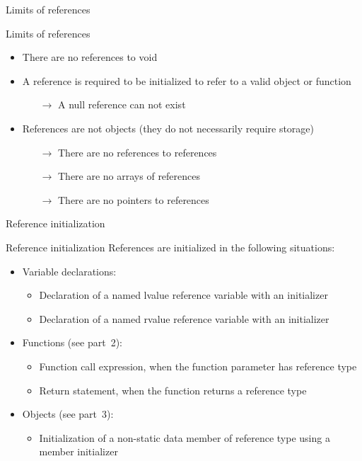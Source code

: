 \begin{frame}{Limits of references}{}
  \begin{block}{Limits of references}
    \begin{itemize}
    \item
      There are no references to void
    \item
      A reference is required to be initialized to refer to a valid object or function
      \begin{itemize}
      \item[$\to$]
        A null reference can not exist
      \end{itemize}
    \item
      References are not objects (they do not necessarily require storage)
      \begin{itemize}
      \item[$\to$]
        There are no references to references
      \item[$\to$]
        There are no arrays of references
      \item[$\to$]
        There are no pointers to references
      \end{itemize}
    \end{itemize}
  \end{block}
\end{frame}

\begin{frame}{Reference initialization}{}
  \begin{block}{Reference initialization}
    References are initialized in the following situations:
    \begin{itemize}
    \item
      Variable declarations:
      \begin{itemize}
      \item
        Declaration of a named lvalue reference variable with an initializer
      \item
        Declaration of a named rvalue reference variable with an initializer
      \end{itemize}
    \item
      Functions (see part~2): %
      \begin{itemize}
      \item
        Function call expression, when the function parameter has reference type
      \item
        Return statement, when the function returns a reference type
      \end{itemize}
    \item
      Objects (see part~3): %
      \begin{itemize}
      \item
         Initialization of a non-static data member of reference type using a member initializer
      \end{itemize}
    \end{itemize}
  \end{block}
\end{frame}

